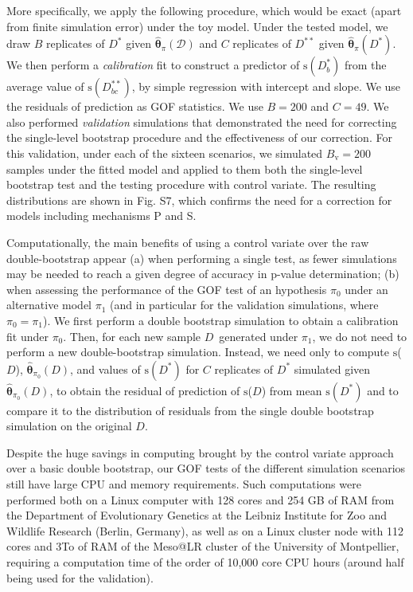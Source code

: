 \documentclass[a4paper]{article}\usepackage[]{graphicx}\usepackage[]{color}
\newcommand{\adata}{\ensuremath{\mathcal{D}}}
\newcommand{\data}{\ensuremath{D}}
\newcommand{\datab}{\ensuremath{D_{b}^*}}
\newcommand{\databb}{\ensuremath{D_{bc}^{**}}}
\newcommand{\sfn}{\ensuremath{\mathrm{s}}}
\newcommand{\bth}{\ensuremath{\boldsymbol{\theta}}}
\begin{document}
More specifically, we apply the following procedure, which would be exact (apart from finite simulation error) under the toy model. Under the tested model, we draw $B$ replicates of $\data^*$ given $\hat{\bth}_\pi(\adata)$ and $C$ replicates of $\data^{**}$ given $\hat{\bth}_\pi(\data^*)$. We then perform a \emph{calibration} fit to construct a predictor of $\sfn(\datab)$  from the average value of $\sfn(\databb)$, by simple regression with intercept and slope. We use the residuals of prediction as GOF statistics. We use $B=200$ and $C=49$. We also performed \emph{validation} simulations that demonstrated the need for correcting the single-level bootstrap procedure and the effectiveness of our correction. For this validation, under each of the sixteen scenarios, we simulated $B_{\mathrm{v}}=200$ samples under the fitted model and applied to them both the single-level bootstrap test and the testing procedure with control variate. The resulting distributions are shown in Fig. S7, which confirms the need for a correction for models including mechanisms P and S.

Computationally, the main benefits of using a control variate over the raw double-bootstrap appear (a) when performing a single test, as fewer simulations may be needed to reach a given degree of accuracy in p-value determination; (b) when assessing the performance of the GOF test of an hypothesis $\pi_0$ under an alternative model $\pi_1$ (and in particular for the validation simulations, where $\pi_0 = \pi_1$). We first perform a double bootstrap simulation to obtain a calibration fit under $\pi_0$. Then, for each new sample \data\ generated under $\pi_1$, we do not need to perform a new double-bootstrap simulation. Instead, we need only to compute \sfn(\data), $\hat{\bth}_{\pi_0}(\data)$, and values of $\sfn(\data^*)$ for $C$ replicates of $\data^*$ simulated given $\hat{\bth}_{\pi_0}(\data)$, to obtain the residual of prediction of \sfn(\data)  from mean $\sfn(\data^*)$ and to compare it to the distribution of residuals from the single double bootstrap simulation on the original \data.

Despite the huge savings in computing brought by the control variate approach over a basic double bootstrap, our GOF tests of the different simulation scenarios still have large CPU and memory requirements. Such computations were performed both on a Linux computer with 128 cores and 254 GB of RAM from the Department of Evolutionary Genetics at the Leibniz Institute for Zoo and Wildlife Research (Berlin, Germany), as well as on a Linux cluster node with 112 cores and 3To of RAM of the Meso@LR cluster of the University of Montpellier, requiring a computation time of the order of 10,000 core CPU hours (around half being used for the validation).
\end{document}
